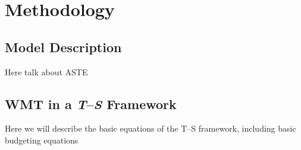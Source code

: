\documentclass[draft]{agujournal2019}
\begin{document}




\section{Methodology}\label{methods}

\subsection{Model Description}

Here talk about ASTE

\subsection{WMT in a \emph{T}--\emph{S} Framework}

Here we will describe the basic equations of the T--S framework, including basic budgeting equations

\end{document}
